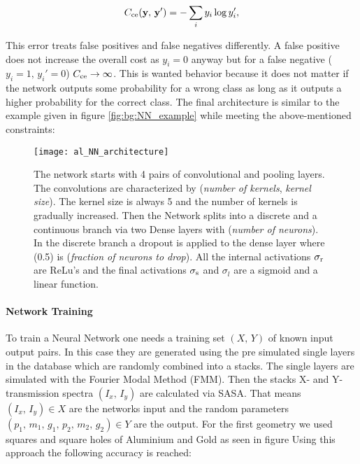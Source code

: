 \begin{equation}
    C_{\mathrm{ce}}(\vb y, \, \vb y') = - \sum_i y_i \log y'_i,
\end{equation}

\noindent
This error treats false positives and false negatives differently. A false positive does not increase the overall cost as $y_i = 0$ anyway but for a false negative ($y_i = 1, \, y_i' = 0$) $C_{\mathrm{ce}} \rightarrow \infty$. This is wanted behavior because it does not matter if the network outputs some probability for a wrong class as long as it outputs a higher probability for the correct class. The final architecture is similar to the example given in figure \ref{fig:bg:NN_example} while meeting the above-mentioned constraints:

\begin{figure}[H]
    \centering
    \texttt{[image: al\_NN\_architecture]}
    \caption{The network starts with 4 pairs of convolutional and pooling layers. The convolutions are characterized by (\textit{number of kernels}, \textit{kernel size}). The kernel size is always 5 and the number of kernels is gradually increased. Then the Network splits into a discrete and a continuous branch via two Dense layers with (\textit{number of neurons}). In the discrete branch a dropout is applied to the dense layer where (0.5) is (\textit{fraction of neurons to drop}).
    All the internal activations $\sigma_{\mathrm{r}}$ are ReLu's and the final activations $\sigma_{\mathrm{s}}$ and $\sigma_{l}$ are a sigmoid and a linear function.}
    \label{fig:al:NN_architecture}
\end{figure}

\newpage
\paragraph{Network Training}
To train a Neural Network one needs a training set $(X, \, Y)$ of known input output pairs. In this case they are generated using the pre simulated single layers in the database which are randomly combined into a stacks. The single layers are simulated with the Fourier Modal Method (FMM). Then the stacks X- and Y-transmission spectra $(I_x, \, I_y)$ are calculated via SASA.
That means $(I_x, \, I_y) \in X$ are the networks input and the random parameters $(p_1, \, m_1, \, g_1, \, p_2, \, m_2, \, g_2) \in Y$ are the output. For the first geometry we used squares and square holes of Aluminium and Gold as seen in figure
Using this approach the following accuracy is reached:

